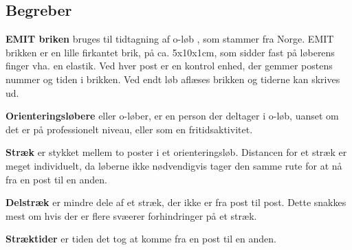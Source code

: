 \subsection{Begreber}
  
\textbf{EMIT briken} bruges til tidtagning af o-løb , som stammer fra Norge. EMIT brikken er en lille firkantet brik, på ca. 5x10x1cm, som sidder fast på løberens finger vha. en elastik. Ved hver post er en kontrol enhed, der gemmer postens nummer og tiden i brikken. Ved endt løb aflæses brikken og tiderne kan skrives ud. 

\textbf{Orienteringsløbere} eller o-løber, er en person der deltager i o-løb, uanset om det er på professionelt niveau, eller som en fritidsaktivitet.

\textbf{Stræk} er stykket mellem to poster i et orienteringsløb. Distancen for et stræk er meget individuelt, da løberne ikke nødvendigvis tager den samme rute for at nå fra en post til en anden.

\textbf{Delstræk} er mindre dele af et stræk, der ikke er fra post til post. Dette snakkes mest om hvis der er flere svæerer forhindringer på et stræk.

\textbf{Stræktider} er tiden det tog at komme fra en post til en anden.

